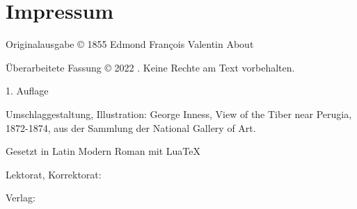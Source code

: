 \chapter*{Impressum}

Originalausgabe © 1855 Edmond François Valentin About

\medskip

Überarbeitete Fassung © 2022 . Keine Rechte am Text vorbehalten.

\medskip

1. Auflage

\medskip

Umschlaggestaltung, Illustration: George Inness, View of the Tiber near Perugia, 1872-1874, aus der Sammlung der National Gallery of Art.

\medskip

Gesetzt in Latin Modern Roman mit Lua\TeX{}

\medskip

Lektorat, Korrektorat:

\medskip

Verlag: 
